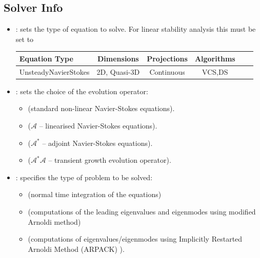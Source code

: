 \subsection{Solver Info}
\label{SectionIncNS_SolverInfo_Stab}

\begin{itemize}
\item {}:  sets the type of equation to solve. For linear stability analysis this must be set to
\begin{center}
    \footnotesize
    \begin{tabular}{lccccc}
        \toprule
        {Equation Type} & {Dimensions} &{Projections} &{Algorithms} \\
        \midrule
        UnsteadyNavierStokes & 2D, Quasi-3D& Continuous &VCS,DS\\
        \bottomrule
    \end{tabular}
\end{center}

\item {}: sets the choice of the evolution operator:
\begin{itemize}
    \item {} (standard non-linear Navier-Stokes equations).
    \item {} ($\mathcal{A}$ -- linearised Navier-Stokes equations).
    \item {} ($\mathcal{A}^*$ -- adjoint Navier-Stokes equations).
    \item {} ($\mathcal{A}^*\mathcal{A}$ -- transient growth evolution operator).
\end{itemize}

\item {}: specifies  the type of problem to be solved:
   \begin{itemize}
    \item {} (normal time integration of the equations)
    \item {} (computations of the leading eigenvalues and eigenmodes using modified Arnoldi method)
    \item {} (computations of eigenvalues/eigenmodes using Implicitly Restarted Arnoldi Method (ARPACK) ).
    \end{itemize}


\end{itemize}
